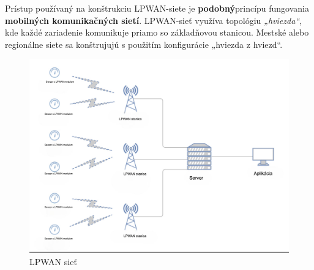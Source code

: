 \documentclass[11pt]{article}
\begin{document}
Prístup používaný na konštrukciu LPWAN-siete je \textbf{podobný}princípu fungovania \textbf{mobilných komunikačných sietí}. LPWAN-sieť využíva topológiu \textit{„hviezda“}, kde každé zariadenie komunikuje priamo so základňovou stanicou. Mestské alebo regionálne siete sa konštrujujú s použitím konfigurácie „hviezda z hviezd“.

\begin{figure}
    \centering
    \includegraphics[width=0.5\linewidth]{LPWAN_pc1.png}
    \caption{LPWAN sieť}
    \label{fig:pc1}
\end{figure}
\end{document}

